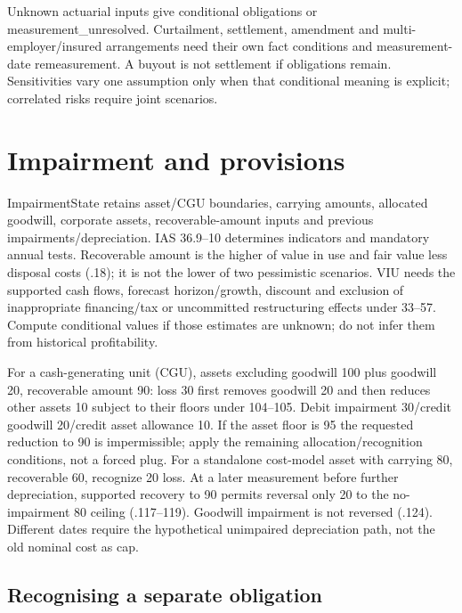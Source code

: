 Unknown actuarial inputs give conditional obligations or measurement\_unresolved. Curtailment, settlement, amendment and multi-employer/insured arrangements need their own fact conditions and measurement-date remeasurement. A buyout is not settlement if obligations remain. Sensitivities vary one assumption only when that conditional meaning is explicit; correlated risks require joint scenarios.

\hypertarget{impairment-and-provisions}{%
\section{Impairment and provisions}\label{method-corporate-extensions-impairment-and-provisions}}

ImpairmentState retains asset/CGU boundaries, carrying amounts, allocated goodwill, corporate assets, recoverable-amount inputs and previous impairments/depreciation. IAS 36.9--10 determines indicators and mandatory annual tests. Recoverable amount is the higher of value in use and fair value less disposal costs (.18); it is not the lower of two pessimistic scenarios. VIU needs the supported cash flows, forecast horizon/growth, discount and exclusion of inappropriate financing/tax or uncommitted restructuring effects under 33--57. Compute conditional values if those estimates are unknown; do not infer them from historical profitability.

For a cash-generating unit (CGU), assets excluding goodwill 100 plus goodwill 20, recoverable amount 90: loss 30 first removes goodwill 20 and then reduces other assets 10 subject to their floors under 104--105. Debit impairment 30/credit goodwill 20/credit asset allowance 10. If the asset floor is 95 the requested reduction to 90 is impermissible; apply the remaining allocation/recognition conditions, not a forced plug. For a standalone cost-model asset with carrying 80, recoverable 60, recognize 20 loss. At a later measurement before further depreciation, supported recovery to 90 permits reversal only 20 to the no-impairment 80 ceiling (.117--119). Goodwill impairment is not reversed (.124). Different dates require the hypothetical unimpaired depreciation path, not the old nominal cost as cap.



\subsection{Recognising a separate obligation}

